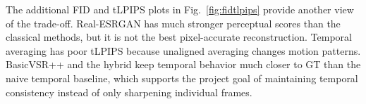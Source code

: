 The additional FID and tLPIPS plots in Fig.~\ref{fig:fidtlpips} provide another view of the trade-off. Real-ESRGAN has much stronger perceptual scores than the classical methods, but it is not the best pixel-accurate reconstruction. Temporal averaging has poor tLPIPS because unaligned averaging changes motion patterns. BasicVSR++ and the hybrid keep temporal behavior much closer to GT than the naive temporal baseline, which supports the project goal of maintaining temporal consistency instead of only sharpening individual frames.
